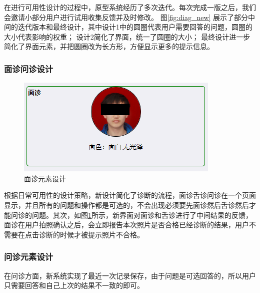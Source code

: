 在进行可用性设计的过程中，原型系统经历了多次迭代。每次完成一版之后，我们会邀请小部分用户进行试用收集反馈并及时修改。
图\ref{fig:diag_new} 展示了部分中间的迭代版本和最终设计，其中设计1中的圆圈代表用户需要回答的问题，圆圈的大小代表影响的权重；
设计2简化了界面，统一了圆圈的大小；
最终设计进一步简化了界面元素，并把圆圈改为长方形，方便显示更多的提示信息。

\subsubsection{面诊问诊设计}

\begin{figure}[h]
    \centering
    \includegraphics[]{images/diag_design.png}
    \caption{面诊元素设计}
    \label{fig:diag_design}
\end{figure}

根据日常可用性的设计策略，新设计简化了诊断的流程，面诊舌诊问诊在一个页面显示，并且所有的问题和操作都是可选的，不会出现必须要先面诊然后舌诊然后才能问诊的问题。其次，如图\ref{fig:diag_design}所示，新界面对面诊和舌诊进行了中间结果的反馈，面诊在用户拍照确认之后，会立即报告本次照片是否合格已经诊断的结果，用户不需要在点击诊断的时候才被提示照片不合格。

\subsubsection{问诊元素设计}
在问诊方面，新系统实现了最近一次记录保存，由于问题是可选回答的，所以用户只需要回答和自己上次的结果不一致的即可。

